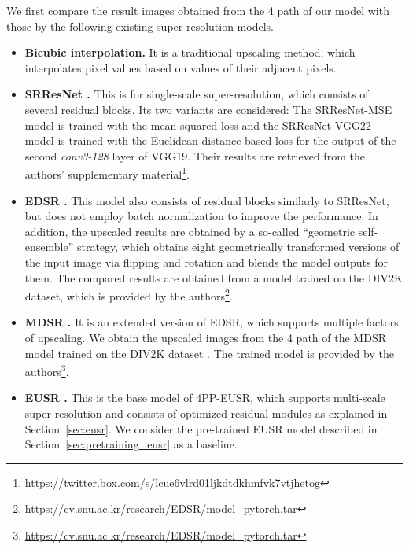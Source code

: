 \documentclass[runningheads]{llncs}
\begin{document}
We first compare the result images obtained from the 4 path of our model with those by the following existing super-resolution models.
\begin{itemize}
	\item \textbf{Bicubic interpolation.}
	It is a traditional upscaling method, which interpolates pixel values based on values of their adjacent pixels.\\
	
	\item \textbf{SRResNet \cite{ledig2017photo}.}
	This is for single-scale super-resolution, which consists of several residual blocks.
	Its two variants are considered: The SRResNet-MSE model is trained with the mean-squared loss and the SRResNet-VGG22 model is trained with the Euclidean distance-based loss for the output of the second \textit{conv3-128} layer of VGG19.
	Their results are retrieved from the authors' supplementary material\footnote{\url{https://twitter.box.com/s/lcue6vlrd01ljkdtdkhmfvk7vtjhetog}}.\\
	
	\item \textbf{EDSR \cite{lim2017enhanced}.}
	This model also consists of residual blocks similarly to SRResNet, but does not employ batch normalization to improve the performance.
	In addition, the upscaled results are obtained by a so-called ``geometric self-ensemble'' strategy, which obtains eight geometrically transformed versions of the input image via flipping and rotation and blends the model outputs for them.
	The compared results are obtained from a model trained on the DIV2K dataset, which is provided by the authors\footnote{\url{https://cv.snu.ac.kr/research/EDSR/model_pytorch.tar}}.\\
	
	\item \textbf{MDSR \cite{lim2017enhanced}.}
	It is an extended version of EDSR, which supports multiple factors of upscaling.
	We obtain the upscaled images from the 4 path of the MDSR model trained on the DIV2K dataset \cite{timofte2018ntire}.
	The trained model is provided by the authors\footnote{\url{https://cv.snu.ac.kr/research/EDSR/model_pytorch.tar}}.\\
	
	\item \textbf{EUSR \cite{kim2018deep}.}
	This is the base model of 4PP-EUSR, which supports multi-scale super-resolution and consists of optimized residual modules as explained in Section~\ref{sec:eusr}.
	We consider the pre-trained EUSR model described in Section~\ref{sec:pretraining_eusr} as a baseline.\\
	

\end{itemize}
\end{document}
